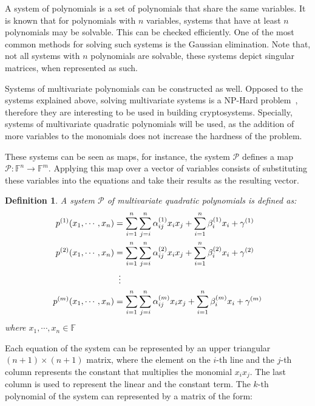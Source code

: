 \documentclass{ufsctex/ufsctex}
\newtheorem{definition}{Definition}
\begin{document}
A system of polynomials is a set of polynomials that share the same variables.
It is known that for polynomials with $n$ variables, systems that have at least
$n$ polynomials may be solvable. This can be checked efficiently. One of the
most common methods for solving such systems is the Gaussian elimination. Note
that, not all systems with $n$ polynomials are solvable, these systems depict
singular matrices, when represented as such.

Systems of multivariate polynomials can be constructed as well. Opposed to the
systems explained above, solving multivariate systems is a NP-Hard
problem~\cite{garey1990npc}, therefore they are interesting to be used in
building cryptosystems. Specially, systems of multivariate quadratic
polynomials will be used, as the addition of more variables to the monomials
does not increase the hardness of the problem. %

These systems can be seen as maps, for instance, the system $\mathcal{P}$
defines a map $\mathcal{P}:\mathbb{F}^n \to \mathbb{F}^m$. Applying this map
over a vector of variables consists of substituting these variables into the
equations and take their results as the resulting vector.

\begin{definition}\label{def:mqsystem}
A system $\mathcal{P}$ of multivariate quadratic polynomials is defined as:
\begin{equation}\label{eq:mqsystem}
\begin{split}
p^{(1)}(x_1,\cdots,x_n) &= \sum_{i=1}^n \sum_{j=i}^n \alpha^{(1)}_{ij} x_i x_j
	+ \sum_{i=1}^n \beta^{(1)}_i x_i + \gamma^{(1)} \\
p^{(2)}(x_1,\cdots,x_n) &= \sum_{i=1}^n \sum_{j=i}^n \alpha^{(2)}_{ij} x_i x_j
	+ \sum_{i=1}^n \beta^{(2)}_i x_i + \gamma^{(2)} \\
&\vdotswithin{=} \\
p^{(m)}(x_1,\cdots,x_n) &= \sum_{i=1}^n \sum_{j=i}^n \alpha^{(m)}_{ij} x_i x_j
	+ \sum_{i=1}^n \beta^{(m)}_i x_i + \gamma^{(m)}
\end{split}
\end{equation}
where $x_1,\cdots,x_n \in \mathbb{F}$
\end{definition}

Each equation of the system can be represented by an upper triangular
$(n+1)\times(n+1)$ matrix, where the element on the $i$-th line and the $j$-th
column represents the constant that multiplies the monomial $x_i x_j$. The last
column is used to represent the linear and the constant term. The $k$-th
polynomial of the system can represented by a matrix of the form:
\end{document}
